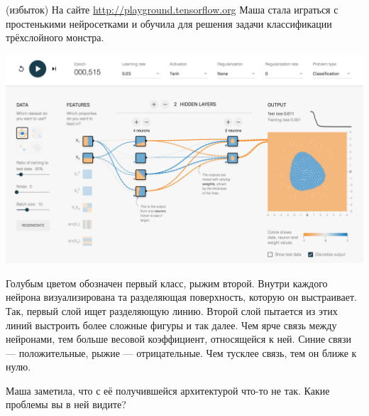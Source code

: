 \documentclass[12pt, a4paper, oneside]{article}
\theoremstyle{plain} %
\theoremstyle{definition}
\begin{document}
\begin{problem}{(избыток)}
На сайте \url{http://playground.tensorflow.org} Маша стала играться с простенькими нейросетками и  обучила для решения задачи классификации трёхслойного монстра.

\begin{center} 
\includegraphics[scale=0.17]{tensorflow_demo.png}
\end{center} 

Голубым цветом обозначен первый класс, рыжим второй. Внутри каждого нейрона визуализирована та разделяющая поверхность, которую он выстраивает. Так, первый слой ищет разделяющую линию. Второй слой пытается из этих линий выстроить более сложные фигуры и так далее. Чем ярче связь между нейронами, тем больше весовой коэффициент, относящейся к ней. Синие связи --- положительные, рыжие --- отрицательные. Чем тусклее связь, тем он ближе к нулю. 

Маша заметила, что с её получившейся архитектурой что-то не так. Какие проблемы вы в ней видите?
\end{problem} 
\end{document}
